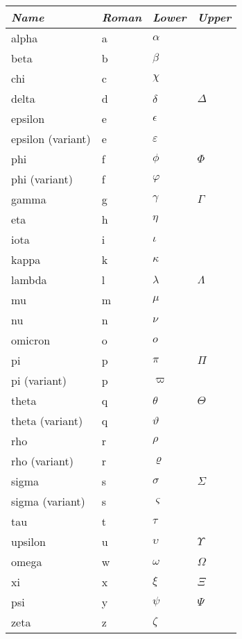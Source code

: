 \setlongtables
\begin{longtable}{l|lll}
  \emph{Name} & \emph{Roman} & \emph{Lower} & \emph{Upper} \\
  \hline
  alpha & a & $\alpha$ & \\
  beta & b & $\beta$ & \\
  chi & c & $\chi$ & \\
  delta & d & $\delta$ & $\Delta$ \\
  epsilon & e & $\epsilon$ & \\
  epsilon (variant) & e & $\varepsilon$ & \\
  phi & f & $\phi$ & $\Phi$ \\
  phi (variant) & f & $\varphi$ & \\
  gamma & g & $\gamma$ & $\Gamma$ \\
  eta & h & $\eta$ & \\
  iota & i & $\iota$ & \\
  kappa & k & $\kappa$ & \\
  lambda & l & $\lambda$ & $\Lambda$ \\
  mu & m & $\mu$ & \\
  nu & n & $\nu$ & \\
  omicron & o & $o$ & \\
  pi & p & $\pi$ & $\Pi$ \\
  pi (variant) & p & $\varpi$ & \\
  theta & q & $\theta$ & $\Theta$ \\
  theta (variant) & q & $\vartheta$ & \\
  rho & r & $\rho$ & \\
  rho (variant) & r & $\varrho$ & \\
  sigma & s & $\sigma$ & $\Sigma$ \\
  sigma (variant) & s & $\varsigma$ & \\
  tau & t & $\tau$ & \\
  upsilon & u & $\upsilon$ & $\Upsilon$ \\
  omega & w & $\omega$ & $\Omega$ \\
  xi & x & $\xi$ & $\Xi$ \\
  psi & y & $\psi$ & $\Psi$ \\
  zeta & z & $\zeta$ & 
\end{longtable}
















